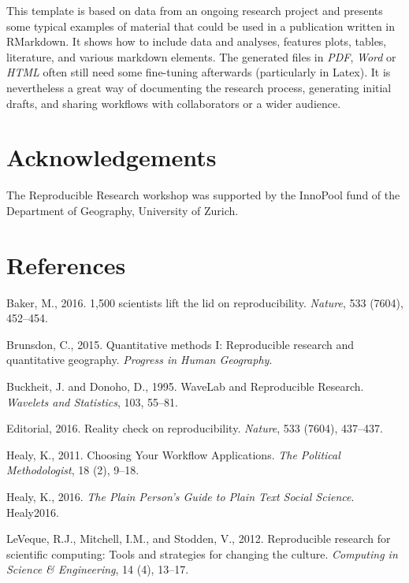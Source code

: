 \documentclass[]{article}
\begin{document}
This template is based on data from an ongoing research project and
presents some typical examples of material that could be used in a
publication written in RMarkdown. It shows how to include data and
analyses, features plots, tables, literature, and various markdown
elements. The generated files in \emph{PDF}, \emph{Word} or \emph{HTML}
often still need some fine-tuning afterwards (particularly in Latex). It
is nevertheless a great way of documenting the research process,
generating initial drafts, and sharing workflows with collaborators or a
wider audience.

\section{Acknowledgements}\label{acknowledgements}

The Reproducible Research workshop was supported by the InnoPool fund of
the Department of Geography, University of Zurich.

\section*{References}\label{references}

\hypertarget{refs}{}
\hypertarget{ref-Baker2016}{}
Baker, M., 2016. 1,500 scientists lift the lid on reproducibility.
\emph{Nature}, 533 (7604), 452--454.

\hypertarget{ref-Brunsdon2015}{}
Brunsdon, C., 2015. Quantitative methods I: Reproducible research and
quantitative geography. \emph{Progress in Human Geography}.

\hypertarget{ref-Buckheit1995}{}
Buckheit, J. and Donoho, D., 1995. WaveLab and Reproducible Research.
\emph{Wavelets and Statistics}, 103, 55--81.

\hypertarget{ref-Nature2016}{}
Editorial, 2016. Reality check on reproducibility. \emph{Nature}, 533
(7604), 437--437.

\hypertarget{ref-Healy2011}{}
Healy, K., 2011. Choosing Your Workflow Applications. \emph{The
Political Methodologist}, 18 (2), 9--18.

\hypertarget{ref-Healy2016}{}
Healy, K., 2016. \emph{The Plain Person's Guide to Plain Text Social
Science}. Healy2016.

\hypertarget{ref-Leveque2012}{}
LeVeque, R.J., Mitchell, I.M., and Stodden, V., 2012. Reproducible
research for scientific computing: Tools and strategies for changing the
culture. \emph{Computing in Science \& Engineering}, 14 (4), 13--17.
\end{document}
